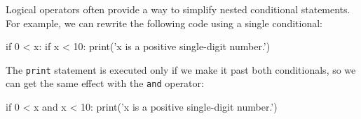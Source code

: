Logical operators often provide a way to simplify nested conditional
statements.  For example, we can rewrite the following code using a
single conditional:

\beforeverb
\begin{pycode}
if 0 < x:
    if x < 10:
        print('x is a positive single-digit number.')
\end{pycode}
\afterverb
%
The {\tt print} statement is executed only if we make it past both
conditionals, so we can get the same effect with the {\tt and} operator:

\beforeverb
\begin{pycode}
if 0 < x and x < 10:
    print('x is a positive single-digit number.')
\end{pycode}
\afterverb		


